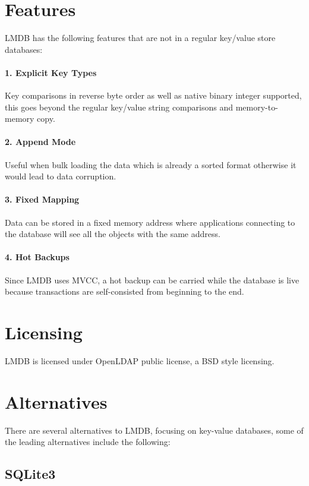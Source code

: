 \documentclass[9pt,twocolumn,twoside]{styles/osajnl}
\begin{document}
\section{Features}

LMDB has the following features that are not in a regular key/value
store databases:

\paragraph {1. Explicit Key Types}
Key comparisons in reverse byte order as well as
native binary integer supported, this goes beyond the regular
key/value string comparisons and memory-to-memory copy.

\paragraph {2. Append Mode}
Useful when bulk loading the data which is already a
sorted format otherwise it would lead to data corruption.

\paragraph{3. Fixed Mapping}
Data can be stored in a fixed memory address where
applications connecting to the database will see all the objects with
the same address.

\paragraph{4. Hot Backups}
Since LMDB uses MVCC, a hot backup can be carried while
the database is live because transactions are self-consisted from
beginning to the end.

\section{Licensing}

LMDB is licensed under OpenLDAP public license, a BSD style
licensing.

\section{Alternatives}

There are several alternatives to LMDB, focusing on key-value
databases, some of the leading alternatives include the following:

\subsection{SQLite3}
\end{document}
